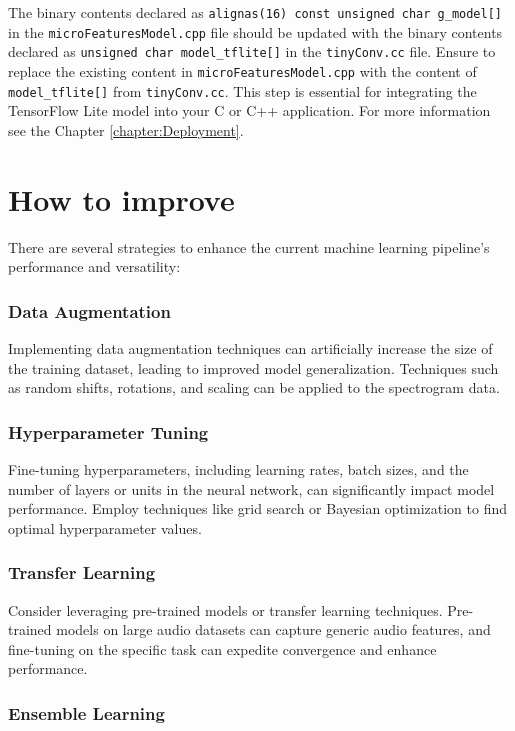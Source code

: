 The binary contents declared as \texttt{alignas(16) const unsigned char g\_model[]} in the \texttt{microFeaturesModel.cpp} file should be updated with the binary contents declared as \texttt{unsigned char model\_tflite[]} in the \texttt{tinyConv.cc} file. Ensure to replace the existing content in \texttt{microFeaturesModel.cpp} with the content of \texttt{model\_tflite[]} from \texttt{tinyConv.cc}. This step is essential for integrating the TensorFlow Lite model into your C or C++ application. For more information see the Chapter \ref{chapter:Deployment}.


\section{How to improve}

There are several strategies to enhance the current machine learning pipeline's performance and versatility:

\subsubsection{Data Augmentation}

Implementing data augmentation techniques can artificially increase the size of the training dataset, leading to improved model generalization. Techniques such as random shifts, rotations, and scaling can be applied to the spectrogram data.

\subsubsection{Hyperparameter Tuning}

Fine-tuning hyperparameters, including learning rates, batch sizes, and the number of layers or units in the neural network, can significantly impact model performance. Employ techniques like grid search or Bayesian optimization to find optimal hyperparameter values.

\subsubsection{Transfer Learning}

Consider leveraging pre-trained models or transfer learning techniques. Pre-trained models on large audio datasets can capture generic audio features, and fine-tuning on the specific task can expedite convergence and enhance performance.

\subsubsection{Ensemble Learning}

